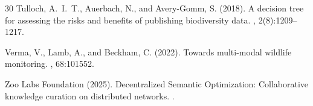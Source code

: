 \documentclass[11pt,a4paper]{article}
\begin{document}
\begin{thebibliography}{30}
Tulloch, A.~I.~T., Auerbach, N., and Avery-Gomm, S. (2018).
\newblock A decision tree for assessing the risks and benefits of publishing biodiversity data.
, 2(8):1209--1217.

Verma, V., Lamb, A., and Beckham, C. (2022).
\newblock Towards multi-modal wildlife monitoring.
, 68:101552.

Zoo Labs Foundation (2025).
\newblock Decentralized Semantic Optimization: Collaborative knowledge curation on distributed networks.
.

\end{thebibliography}
\end{document}

